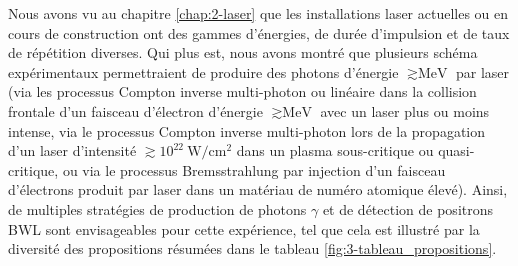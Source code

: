 \begin{refsection}
Nous avons vu au chapitre \ref{chap:2-laser} que les installations laser actuelles ou en cours de construction ont des gammes d'énergies, de durée d'impulsion et de taux de répétition diverses. Qui plus est, nous avons montré que plusieurs schéma expérimentaux permettraient de produire des photons d'énergie $\gtrsim \si{\MeV}$ par laser (via les processus Compton inverse multi-photon ou linéaire dans la collision frontale d'un faisceau d'électron d'énergie $\gtrsim \si{\MeV}$ avec un laser plus ou moins intense, via le processus Compton inverse multi-photon lors de la propagation d'un laser d'intensité $\gtrsim 10^{22} ~ \si{\W \per \cm^2}$ dans un plasma sous-critique ou quasi-critique, ou via le processus Bremsstrahlung par injection d'un faisceau d'électrons produit par laser dans un matériau de numéro atomique élevé). Ainsi, de multiples stratégies de production de photons $\gamma$ et de détection de positrons BWL sont envisageables pour cette expérience, tel que cela est illustré par la diversité des propositions résumées dans le tableau \ref{fig:3-tableau_propositions}. 


\end{refsection}
